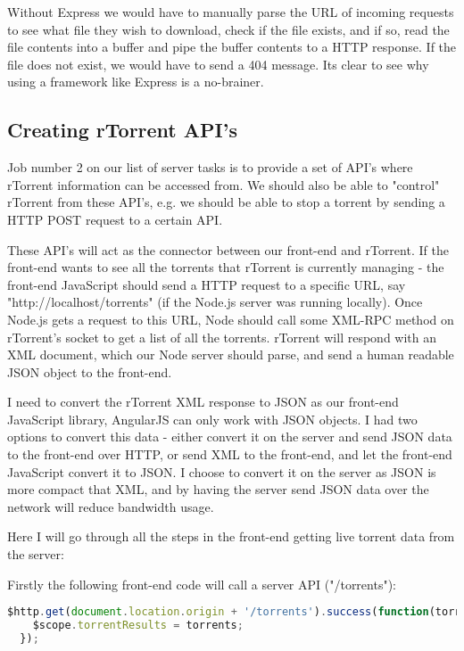 Without Express we would have to manually parse the URL of incoming requests to see what file they wish to download, check if the file exists, and if so, read the file contents into a buffer and pipe the buffer contents to a HTTP response. If the file does not exist, we would have to send a 404 message. Its clear to see why using a framework like Express is a no-brainer.  

\subsection{Creating rTorrent API's}
Job number 2 on our list of server tasks is to provide a set of API's where rTorrent information can be accessed from. We should also be able to "control" rTorrent from these API's, e.g. we should be able to stop a torrent by sending a HTTP POST request to a certain API.

These API's will act as the connector between our front-end and rTorrent. If the front-end wants to see all the torrents that rTorrent is currently managing - the front-end JavaScript should send a HTTP request to a specific URL, say "http://localhost/torrents" (if the Node.js server was running locally). Once Node.js gets a request to this URL, Node should call some XML-RPC method on rTorrent's socket to get a list of all the torrents. rTorrent will respond with an XML document, which our Node server should parse, and send a human readable JSON object to the front-end.

I need to convert the rTorrent XML response to JSON as our front-end JavaScript library, AngularJS can only work with JSON objects. I had two options to convert this data - either convert it on the server and send JSON data to the front-end over HTTP, or send XML to the front-end, and let the front-end JavaScript convert it to JSON. I choose to convert it on the server as JSON is more compact that XML, and by having the server send JSON data over the network will reduce bandwidth usage.

Here I will go through all the steps in the front-end getting live torrent data from the server:

Firstly the following front-end code will call a server API ("/torrents"):
\vspace{10px}
\begin{lstlisting}[caption=AngularJS performing a HTTP GET, language=JavaScript]
  $http.get(document.location.origin + '/torrents').success(function(torrents) {
    $scope.torrentResults = torrents;
  });
\end{lstlisting}


